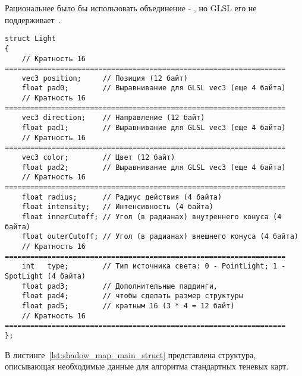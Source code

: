 Рациональнее было бы использовать объединение - , но GLSL его не
поддерживает~\cite{}.

\begin{center}
\captionsetup{justification=centering, singlelinecheck=off}
\begin{lstlisting}[label=lst:light_struct, caption={Источник освещения}]
struct Light
{
    // Кратность 16 ==================================================================
    vec3 position;     // Позиция (12 байт)
    float pad0;        // Выравнивание для GLSL vec3 (еще 4 байта)
    // Кратность 16 ==================================================================
    vec3 direction;    // Направление (12 байт)
    float pad1;        // Выравнивание для GLSL vec3 (еще 4 байта)
    // Кратность 16 ==================================================================
    vec3 color;        // Цвет (12 байт)
    float pad2;        // Выравнивание для GLSL vec3 (еще 4 байта)
    // Кратность 16 ==================================================================
    float radius;      // Радиус действия (4 байта)
    float intensity;   // Интенсивность (4 байта)
    float innerCutoff; // Угол (в радианах) внутреннего конуса (4 байта)
    float outerCutoff; // Угол (в радианах) внешнего конуса (4 байта)
    // Кратность 16 ==================================================================
    int   type;        // Тип источника света: 0 - PointLight; 1 - SpotLight (4 байта)
    float pad3;        // Дополнительные паддинги,
    float pad4;        // чтобы сделать размер структуры
    float pad5;        // кратным 16 (3 * 4 = 12 байт)
    // Кратность 16 ==================================================================
};
\end{lstlisting}
\end{center}

В листинге~\ref{lst:shadow_map_main_struct} представлена структура,
описывающая необходимые данные для алгоритма стандартных теневых карт.

